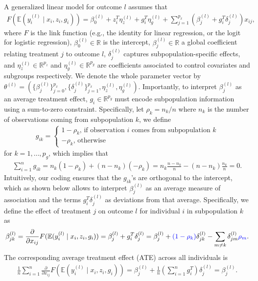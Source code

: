 \documentclass[pdflatex,sn-mathphys-num]{sn-jnl}%
\theoremstyle{thmstyleone}%
\theoremstyle{thmstyletwo}%
\theoremstyle{thmstylethree}%
\begin{document}
A generalized linear model for outcome $l$ assumes that
\begin{align}
  F( \mathbb E (y_i^{(l)} \mid x_i, z_i, g_i) )=
  \beta_0^{(l)} + z_i^T \eta_z^{(l)} + g_i^T \eta_g^{(l)} + \sum_{j=1}^{p_x} (\beta_j^{(l)} + g_i^T \delta_j^{(l)}) x_{ij},
\label{eq:outcome_equation}
\end{align}
where $F$ is the link function (e.g., the identity for linear regression, or the logit for logistic regression),
$\beta_0^{(l)} \in \mathbb{R}$ is the intercept,
$\beta_j^{(l)} \in \mathbb{R}$ a global coefficient relating treatment $j$ to outcome $l$,
$\delta_j^{(l)}$ captures subpopulation-specific effects,
and $\eta_z^{(l)} \in \mathbb{R}^{p_z}$ and $\eta_g^{(l)} \in \mathbb{R}^{p_g}$ are coefficients associated to control covariates and subgroups respectively.
We denote the whole parameter vector by $\theta^{(l)}= (\{ \beta_j^{(l)} \}_{j=0}^{p_x}, \{ \delta_j^{(l)} \}_{j=1}^{p_x}, \eta_z^{(l)}, \eta_g^{(l)})$.
Importantly, to interpret $\beta_j^{(l)}$ as an average treatment effect, $g_i \in \mathbb{R}^{p_g}$ must encode subpopulation information using a sum-to-zero constraint.
\color{blue} Specifically, let $\rho_k=n_k/n$ where $n_k$ is the number of observations coming from subpopulation $k$, we define
\begin{align}
  g_{ik}= \begin{cases}
    1 - \rho_k  \mbox{, if observation } i \mbox{ comes from subpopulation } k \\
    - \rho_k \mbox{, otherwise}
    \end{cases}
\nonumber
\end{align}
for $k=1,\ldots,p_g$, which implies that 
\begin{align}
 \sum_{i=1}^n g_{ik}= n_k (1-\rho_k) + (n - n_k) (- \rho_k)= n_k \frac{n - n_k}{n} - (n-n_k) \frac{n_k}{n} = 0.
\nonumber
\end{align}
Intuitively, our coding ensures that the $g_{ik}$'s are orthogonal to the intercept, which as shown below allows to interpret $\beta_j^{(l)}$ as an average measure of association and the terms $g_i^T \delta_j^{(l)}$ as deviations from that average. Specifically,
\color{black} we define the effect of treatment $j$ on outcome $l$ for individual $i$ in subpopulation $k$ as
\begin{align}
\beta_{jk}^{(l)}=  \frac{\partial}{\partial x_{ij}} F(\mathbb E (y_i^{(l)} \mid x_i, z_i, g_i)) 
= \beta_j^{(l)} + g_i^T \delta_j^{(l)}
= \beta_j^{(l)} + \color{blue} (1-\rho_k) \color{black} \delta_{jk}^{(l)} - \sum_{m \neq k} \delta_{jm}^{(l)} \color{blue} \rho_m \color{black}.
\nonumber
\end{align}
The corresponding average treatment effect (ATE) across all individuals is
\begin{align}
\frac{1}{n} \sum_{i=1}^n \frac{\partial}{\partial x_{ij}} F(\mathbb E (y_i^{(l)} \mid x_i, z_i, g_i))
= \beta_j^{(l)} + \frac{1}{n} \left( \sum_{i=1}^n g_i^T \right) \delta_j^{(l)}= \beta_j^{(l)}.
\nonumber
\end{align}
\end{document}
